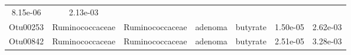 \documentclass[11pt,]{article}
\begin{document}
\begin{longtable}[]{@{}ccccccc@{}}
\begin{minipage}[t]{0.09\columnwidth}
8.15e-06\strut
\end{minipage} & \begin{minipage}[t]{0.09\columnwidth}\centering\strut
2.13e-03\strut
\end{minipage}\tabularnewline
\begin{minipage}[t]{0.09\columnwidth}\centering\strut
Otu00253\strut
\end{minipage} & \begin{minipage}[t]{0.17\columnwidth}\centering\strut
Ruminococcaceae\strut
\end{minipage} & \begin{minipage}[t]{0.17\columnwidth}\centering\strut
Ruminococcaceae\strut
\end{minipage} & \begin{minipage}[t]{0.09\columnwidth}\centering\strut
adenoma\strut
\end{minipage} & \begin{minipage}[t]{0.11\columnwidth}\centering\strut
butyrate\strut
\end{minipage} & \begin{minipage}[t]{0.09\columnwidth}\centering\strut
1.50e-05\strut
\end{minipage} & \begin{minipage}[t]{0.09\columnwidth}\centering\strut
2.62e-03\strut
\end{minipage}\tabularnewline
\begin{minipage}[t]{0.09\columnwidth}\centering\strut
Otu00842\strut
\end{minipage} & \begin{minipage}[t]{0.17\columnwidth}\centering\strut
Ruminococcaceae\strut
\end{minipage} & \begin{minipage}[t]{0.17\columnwidth}\centering\strut
Ruminococcaceae\strut
\end{minipage} & \begin{minipage}[t]{0.09\columnwidth}\centering\strut
adenoma\strut
\end{minipage} & \begin{minipage}[t]{0.11\columnwidth}\centering\strut
butyrate\strut
\end{minipage} & \begin{minipage}[t]{0.09\columnwidth}\centering\strut
2.51e-05\strut
\end{minipage} & \begin{minipage}[t]{0.09\columnwidth}\centering\strut
3.28e-03\strut
\end{minipage}\tabularnewline

\end{longtable}
\end{document}
